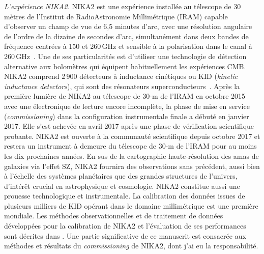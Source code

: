 \emph{L'expérience NIKA2.} NIKA2 est une expérience installée au
télescope de 30 mètres de l'Institut de RadioAstronomie Millimétrique
(IRAM) capable d'observer un champ de vue de 6,5 minutes d'arc, avec
une résolution angulaire de l'ordre de la dizaine de secondes d'arc,
simultanément dans deux bandes de fréquence centrées à 150 et
260\,GHz et sensible à la polarisation dans le canal à
260\,GHz~. Une de ses particularités est
d'utiliser une technologie de détection alternative aux bolomètres qui
équipent habituellement les expériences CMB. NIKA2 comprend 2\,900
détecteurs à inductance cinétiques ou KID (\emph{kinetic inductance
detectors}), qui sont des résonateurs
superconducteurs~. Après la première lumière de NIKA2 au
télescope de 30-m de l'IRAM en octobre 2015 avec une électronique de
lecture encore incomplète, la phase de mise en service
(\emph{commissioning}) dans la configuration instrumentale finale a
débuté en janvier 2017. Elle s'est achevée en avril 2017 après une
phase de vérification scientifique probante. NIKA2 est ouverte à la
communauté scientifique depuis octobre 2017 et restera un instrument à
demeure du télescope de 30-m de l'IRAM pour au moins les dix
prochaines années. En sus de la cartographie haute-résolution des amas
de galaxies via l'effet SZ, NIKA2 fournira des observations sans
précédent, aussi bien à l'échelle des systèmes planétaires que des
grandes structures de l'univers, d'intérêt crucial en astrophysique et
cosmologie. NIKA2 constitue aussi une prouesse technologique et
instrumentale. La calibration des données issues de plusieurs milliers
de KID opérant dans le domaine millimétrique est une première
mondiale. Les méthodes observationnelles et de traitement de données
développées pour la calibration de NIKA2 et l'évaluation de ses
performances sont décrites dans . Une partie
significative de ce manuscrit est consacrée aux méthodes et résultats
du \emph{commissioning} de NIKA2, dont j'ai eu la responsabilité.\\ 

